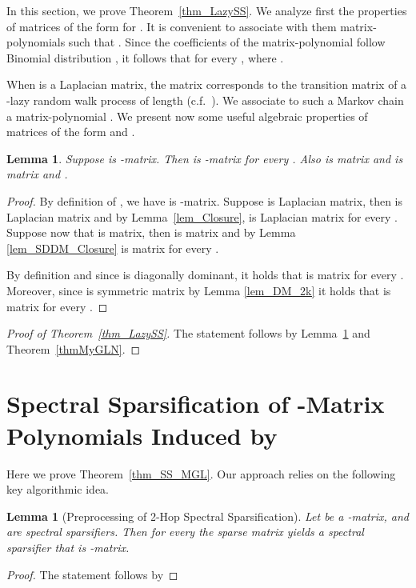 \documentclass[11pt]{article}
\newcommand{\lemref}[1]{Lemma~\ref{lem:#1}}
\newcommand{\mylemma}[2]{\begin{lem}\label{lem:#1}#2\end{lem}}
\newtheorem{lem}[thm]{Lemma}
\numberwithin{thm}{section}
\begin{document}
In this section, we prove Theorem~\ref{thm_LazySS}. We analyze first the properties of matrices of the form  for . It is convenient to associate with them matrix-polynomials  such that . Since the coefficients of the matrix-polynomial  follow Binomial distribution , it follows that
 for every , where .

When  is a Laplacian matrix, the matrix  corresponds to the transition matrix of a -lazy random walk process of length  (c.f.~\cite{SJ89}). We associate to such a Markov chain a matrix-polynomial . We present now some useful algebraic properties of matrices of the form  and .

\newcommand{\lemDDWWp}
{
Suppose  is -matrix. Then
 is -matrix for every . Also 
is  matrix  and 
is  matrix  and .
}
\mylemma{lemDDWWp}{\lemDDWWp}

\begin{proof}
By definition of , we have  is -matrix. Suppose  is Laplacian matrix, then  is Laplacian matrix and by Lemma~\ref{lem_Closure},  is Laplacian matrix for every . Suppose now that  is  matrix, then  is  matrix and by Lemma \ref{lem_SDDM_Closure}  is  matrix for every .

By definition 
and since  is diagonally dominant, it holds that
 is  matrix for every .
Moreover, since  is symmetric matrix by Lemma \ref{lem_DM_2k} it holds that  is  matrix for every .
\end{proof}

\begin{proof}[Proof of Theorem~\ref{thm_LazySS}] The statement follows by \lemref{lemDDWWp} and Theorem~\ref{thmMyGLN}.
\end{proof}


\section{Spectral Sparsification of -Matrix Polynomials Induced by }\label{sec:SSGLBM}

Here we prove Theorem~\ref{thm_SS_MGL}. Our approach relies on the following key algorithmic idea.

\begin{lem}[Preprocessing of 2-Hop Spectral Sparsification]\label{lem_DMp2}
Let  be a -matrix,  and  are spectral sparsifiers. Then for every  the sparse matrix  yields a spectral sparsifier  that is -matrix.
\end{lem}

\begin{proof}
The statement follows by

\end{proof}
\end{document}
